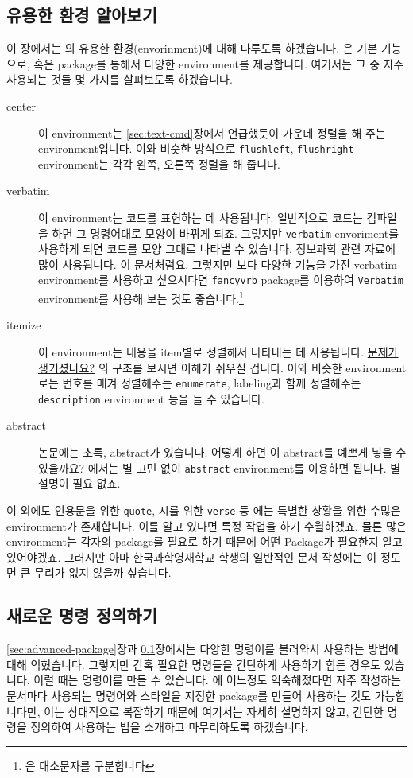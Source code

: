 \subsection{유용한 환경 알아보기}
\label{sec:advanced-environment}
이 장에서는 \lt 의 유용한 환경(envorinment)에 대해 다루도록 하겠습니다. \lt 은 기본 기능으로, 혹은 package를 통해서 다양한 environment를 제공합니다. 여기서는 그 중 자주 사용되는 것들 몇 가지를 살펴보도록 하겠습니다.
\begin{description}
\item[center] 이 environment는 \ref{sec:text-cmd}장에서 언급했듯이 가운데 정렬을 해 주는 environment입니다. 이와 비슷한 방식으로 \verb|flushleft|, \verb|flushright| environment는 각각 왼쪽, 오른쪽 정렬을 해 줍니다.
\item[verbatim] 이 environment는 코드를 표현하는 데 사용됩니다. 일반적으로 \lt 코드는 컴파일을 하면 그 명령어대로 모양이 바뀌게 되죠. 그렇지만 \verb|verbatim| envoriment를 사용하게 되면 코드를 모양 그대로 나타낼 수 있습니다. 정보과학 관련 자료에 많이 사용됩니다. 이 문서처럼요. 그렇지만 보다 다양한 기능을 가진 verbatim environment를 사용하고 싶으시다면 \verb|fancyvrb| package를 이용하여 \verb|Verbatim| environment를 사용해 보는 것도 좋습니다.\footnote{\lt 은 대소문자를 구분합니다}
\item[itemize] 이 environment는 내용을 item별로 정렬해서 나타내는 데 사용됩니다.  \hyperref[sec2:problem]{문제가 생기셨나요?} 의 구조를 보시면 이해가 쉬우실 겁니다. 이와 비슷한 environment로는 번호를 매겨 정렬해주는 \verb|enumerate|, labeling과 함께 정렬해주는 \verb|description| environment 등을 들 수 있습니다.
\item[abstract] 논문에는 초록, abstract가 있습니다. 어떻게 하면 이 abstract를 예쁘게 넣을 수 있을까요? \lt 에서는 별 고민 없이 \verb|abstract| environment를 이용하면 됩니다. 별 설명이 필요 없죠.
\end{description}
이 외에도 인용문을 위한 \verb|quote|, 시를 위한 \verb|verse| 등 \lt 에는 특별한 상황을 위한 수많은 environment가 존재합니다. 이를 알고 있다면 특정 작업을 하기 수월하겠죠. 물론 많은 environment는 각자의 package를 필요로 하기 때문에 어떤 Package가 필요한지 알고 있어야겠죠. 그러지만 아마 한국과학영재학교 학생의 일반적인 문서 작성에는 이 정도면 큰 무리가 없지 않을까 싶습니다.

\subsection{새로운 명령 정의하기}
\label{sec:advanced-newcmd}
\ref{sec:advanced-package}장과 \ref{sec:advanced-environment}장에서는 다양한 \lt 명령어를 불러와서 사용하는 방법에 대해 익혔습니다.
그렇지만 간혹 필요한 명령들을 간단하게 사용하기 힘든 경우도 있습니다.
이럴 때는 명령어를 만들 수 있습니다.
\lt 에 어느정도 익숙해졌다면 자주 작성하는 문서마다 사용되는 명령어와 스타일을 지정한 package를 만들어 사용하는 것도 가능합니다만, 이는 상대적으로 복잡하기 때문에 여기서는 자세히 설명하지 않고, 간단한 명령을 정의하여 사용하는 법을 소개하고 마무리하도록 하겠습니다.


